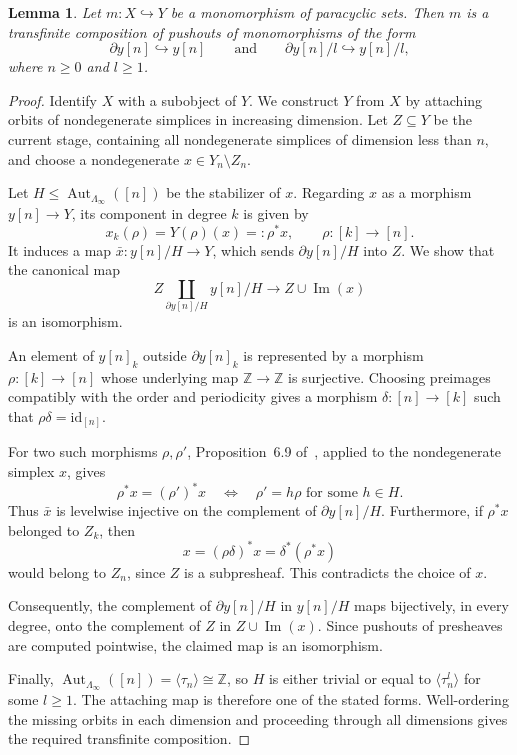\documentclass{article}
\theoremstyle{plain}
\newtheorem{lemma}[theorem]{Lemma}
\theoremstyle{definition}
\theoremstyle{remark}
\begin{document}
\begin{lemma}\label{lem:genOfMonoInPar}
Let $m\colon X\hookrightarrow Y$ be a monomorphism of paracyclic sets.
Then $m$ is a transfinite composition of pushouts of monomorphisms of
the form
\[
\partial y[n]\hookrightarrow y[n]
\qquad\text{and}\qquad
\partial y[n]/l\hookrightarrow y[n]/l,
\]
where $n\geq 0$ and $l\geq 1$.
\end{lemma}
\begin{proof}
Identify $X$ with a subobject of $Y$. We construct $Y$ from $X$
by attaching orbits of nondegenerate simplices in increasing
dimension. Let $Z\subseteq Y$ be the current stage, containing
all nondegenerate simplices of dimension less than $n$, and
choose a nondegenerate $x\in Y_n\setminus Z_n$.

Let $H\leq\operatorname{Aut}_{\Lambda_\infty}([n])$ be the
stabilizer of $x$. Regarding $x$ as a morphism $y[n]\to Y$,
its component in degree $k$ is given by
\[
x_k(\rho)=Y(\rho)(x)=:\rho^*x,
\qquad \rho\colon[k]\to[n].
\]
It induces a map $\bar x\colon y[n]/H\to Y$,
which sends $\partial y[n]/H$ into $Z$.
We show that the canonical map
\[
Z\coprod_{\partial y[n]/H}y[n]/H
\longrightarrow Z\cup\operatorname{Im}(x)
\]
is an isomorphism.

An element of $y[n]_k$ outside $\partial y[n]_k$ is represented
by a morphism $\rho\colon[k]\to[n]$ whose underlying map
$\mathbb Z\to\mathbb Z$ is surjective. Choosing preimages
compatibly with the order and periodicity gives a morphism
$\delta\colon[n]\to[k]$ such that $\rho\delta=\mathrm{id}_{[n]}$.

For two such morphisms $\rho,\rho'$, Proposition~6.9
of~\cite{BM2011}, applied to the nondegenerate simplex $x$,
gives
\[
\rho^*x=(\rho')^*x
\quad\Longleftrightarrow\quad
\rho'=h\rho \text{ for some }h\in H.
\]
Thus $\bar x$ is levelwise injective on the complement
of $\partial y[n]/H$.
Furthermore, if $\rho^*x$ belonged to $Z_k$, then
\[
x=(\rho\delta)^*x=\delta^*(\rho^*x)
\]
would belong to $Z_n$, since $Z$ is a subpresheaf.
This contradicts the choice of $x$.

Consequently, the complement of $\partial y[n]/H$ in $y[n]/H$
maps bijectively, in every degree, onto the complement of $Z$
in $Z\cup\operatorname{Im}(x)$.
Since pushouts of presheaves are computed pointwise,
the claimed map is an isomorphism.

Finally, $\operatorname{Aut}_{\Lambda_\infty}([n])
=\langle\tau_n\rangle\cong\mathbb Z$, so $H$ is either trivial
or equal to $\langle\tau_n^l\rangle$ for some $l\geq1$.
The attaching map is therefore one of the stated forms.
Well-ordering the missing orbits in each dimension and
proceeding through all dimensions gives the required
transfinite composition.
\end{proof}
\end{document}
